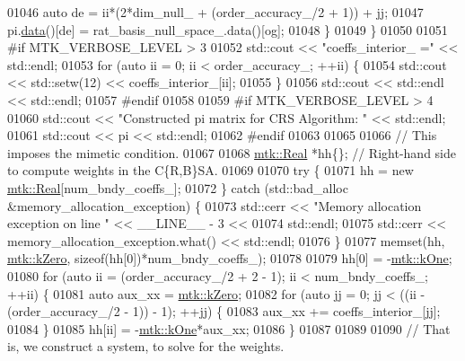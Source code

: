 \begin{DoxyCode}
{{01046       \textcolor{keyword}{auto} de = ii*(2*dim\_null\_ + (order\_accuracy\_/2 + 1)) + jj;
01047       pi.\hyperlink{classmtk_1_1DenseMatrix_a0c33b8a9e01d157c61ddbdf807c25d84}{data}()[de] = rat\_basis\_null\_space\_.data()[og];
01048     \}
01049   \}
01050 
01051 \textcolor{preprocessor}{  #if MTK\_VERBOSE\_LEVEL > 3}
01052   std::cout << \textcolor{stringliteral}{"coeffs\_interior\_ ="} << std::endl;
01053   \textcolor{keywordflow}{for} (\textcolor{keyword}{auto} ii = 0; ii < order\_accuracy\_; ++ii) \{
01054     std::cout << std::setw(12) << coeffs\_interior\_[ii];
01055   \}
01056   std::cout << std::endl << std::endl;
01057 \textcolor{preprocessor}{  #endif}
01058 
01059 \textcolor{preprocessor}{  #if MTK\_VERBOSE\_LEVEL > 4}
01060   std::cout << \textcolor{stringliteral}{"Constructed pi matrix for CRS Algorithm: "} << std::endl;
01061   std::cout << pi << std::endl;
01062 \textcolor{preprocessor}{  #endif}
01063 
01065 
01066   \textcolor{comment}{// This imposes the mimetic condition.}
01067 
01068   \hyperlink{group__c01-roots_gac080bbbf5cbb5502c9f00405f894857d}{mtk::Real} *hh\{\};  \textcolor{comment}{// Right-hand side to compute weights in the C\{R,B\}SA.}
01069 
01070   \textcolor{keywordflow}{try} \{
01071     hh = \textcolor{keyword}{new} \hyperlink{group__c01-roots_gac080bbbf5cbb5502c9f00405f894857d}{mtk::Real}[num\_bndy\_coeffs\_];
01072   \} \textcolor{keywordflow}{catch} (std::bad\_alloc &memory\_allocation\_exception) \{
01073     std::cerr << \textcolor{stringliteral}{"Memory allocation exception on line "} << \_\_LINE\_\_ - 3 <<
01074       std::endl;
01075     std::cerr << memory\_allocation\_exception.what() << std::endl;
01076   \}
01077   memset(hh, \hyperlink{group__c01-roots_ga59a451a5fae30d59649bcda274fea271}{mtk::kZero}, \textcolor{keyword}{sizeof}(hh[0])*num\_bndy\_coeffs\_);
01078 
01079   hh[0] = -\hyperlink{group__c01-roots_ga26407c24d43b6b95480943340d285c71}{mtk::kOne};
01080   \textcolor{keywordflow}{for} (\textcolor{keyword}{auto} ii = (order\_accuracy\_/2 + 2 - 1); ii < num\_bndy\_coeffs\_; ++ii) \{
01081     \textcolor{keyword}{auto} aux\_xx = \hyperlink{group__c01-roots_ga59a451a5fae30d59649bcda274fea271}{mtk::kZero};
01082     \textcolor{keywordflow}{for} (\textcolor{keyword}{auto} jj = 0; jj < ((ii - (order\_accuracy\_/2 - 1)) - 1); ++jj) \{
01083       aux\_xx += coeffs\_interior\_[jj];
01084     \}
01085     hh[ii] = -\hyperlink{group__c01-roots_ga26407c24d43b6b95480943340d285c71}{mtk::kOne}*aux\_xx;
01086   \}
01087 
01089 
01090   \textcolor{comment}{// That is, we construct a system, to solve for the weights.}
}}
\end{DoxyCode}
